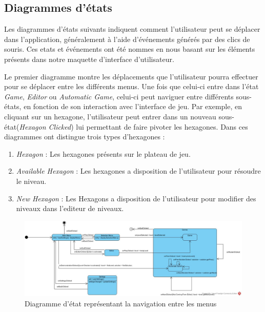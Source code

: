 \documentclass[]{article}
\begin{document}
\subsection{Diagrammes d'états}

Les diagrammes d'états suivants indiquent comment l'utilisateur peut se déplacer dans l'application, généralement à l'aide d'événements générés par des clics de souris. Ces etats et événements ont été nommes en nous basant sur les éléments présents dans notre maquette d'interface d'utilisateur.

Le premier diagramme montre les déplacements que l'utilisateur pourra effectuer pour se déplacer entre les différents menus. Une fois que celui-ci entre dans l'état \emph{Game}, \emph{Editor} ou \emph{Automatic Game}, celui-ci peut naviguer entre différents sous-états, en fonction de son interaction avec l'interface de jeu. Par exemple, en cliquant sur un hexagone, l'utilisateur peut entrer dans un nouveau sous-état(\emph{Hexagon Clicked}) lui permettant de faire pivoter les hexagones. Dans ces diagrammes ont distingue trois types d'hexagones :
\begin{enumerate}
\item \emph{Hexagon} : Les hexagones présents sur le plateau de jeu.
\item \emph{Available Hexagon} : Les hexagones a disposition de l'utilisateur pour résoudre le niveau.
\item \emph{New Hexagon} : Les Hexagons a disposition de l'utilisateur pour modifier des niveaux dans l'editeur de niveaux.
\end{enumerate}

\begin{figure}[H]
\begin{center}
  \includegraphics[width=\textwidth]{State1.jpg}
  \caption{Diagramme d'état représentant la navigation entre les menus}\label{fig:auto}
\end{center}
\end{figure}
\end{document}
